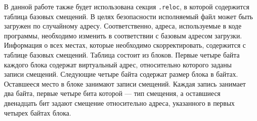 В данной работе также будет использована секция \verb!.reloc!, в которой
содержится таблица базовых смещений. В целях безопасности исполняемый файл может
быть загружен по случайному адресу. Соответственно, адреса, используемые в коде
программы, необходимо изменить в соответствии с базовым адресом загрузки.
Информация о всех местах, которые необходимо скорректировать, содержится с
таблице базовых смещений. Таблица состоит из блоков. Первые четыре байта каждого
блока содержат виртуальный адрес, относительно которого заданы записи смещений.
Следующие четыре байта содержат размер блока в байтах. Оставшееся место в блоке
занимают записи смещений. Каждая запись занимает два байта, первые четыре бита
которой --- тип смещения, а оставшиеся двенадцать бит задают смещение
относительно адреса, указанного в первых четырех байтах блока.
